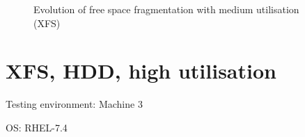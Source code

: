 \documentclass[
  color, %
  table, %
  lof,   %
  lot,   %
]{fithesis3}
\begin{document}
\begin{figure}[htb]
    \centering
    \caption{Evolution of free space fragmentation with medium utilisation (XFS)}
    \label{fig:free80}
\end{figure}

\section{XFS, HDD, high utilisation}
\begin{compactenum}
  \item Testing environment: Machine 3
  \item OS: RHEL-7.4 
  \end{compactenum}
\end{document}
